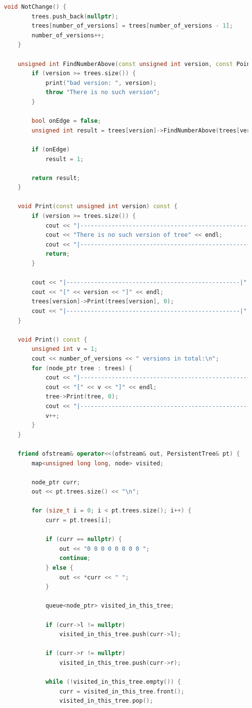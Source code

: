 \begin{lstlisting}[language=c++]
	void NotChange() {
		trees.push_back(nullptr);
		trees[number_of_versions] = trees[number_of_versions - 1];
		number_of_versions++;
	}

	unsigned int FindNumberAbove(const unsigned int version, const Point& p, long* left_ancestor, long* right_ancestor) {
		if (version >= trees.size()) {
			print("bad version: ", version);
			throw "There is no such version";
		}

		bool onEdge = false;
		unsigned int result = trees[version]->FindNumberAbove(trees[version], p, &onEdge, left_ancestor, right_ancestor);

		if (onEdge) 
			result = 1;

		return result; 
	}

	void Print(const unsigned int version) const {
		if (version >= trees.size()) {
			cout << "|--------------------------------------------------|" << endl;
			cout << "There is no such version of tree" << endl;
			cout << "|--------------------------------------------------|" << endl;
			return;
		}

		cout << "|--------------------------------------------------|" << endl;
		cout << "[" << version << "]" << endl;
		trees[version]->Print(trees[version], 0);
		cout << "|--------------------------------------------------|" << endl;
	}

	void Print() const {
		unsigned int v = 1;
		cout << number_of_versions << " versions in total:\n";
		for (node_ptr tree : trees) {
			cout << "|--------------------------------------------------|" << endl;
			cout << "[" << v << "]" << endl;
			tree->Print(tree, 0);
			cout << "|--------------------------------------------------|" << endl;
			v++;
		}
	}

	friend ofstream& operator<<(ofstream& out, PersistentTree& pt) {
		map<unsigned long long, node> visited;

		node_ptr curr;
		out << pt.trees.size() << "\n";

		for (size_t i = 0; i < pt.trees.size(); i++) {
			curr = pt.trees[i];

			if (curr == nullptr) {
				out << "0 0 0 0 0 0 0 0 ";
				continue;
			} else {
				out << *curr << " ";
			}

			queue<node_ptr> visited_in_this_tree;

			if (curr->l != nullptr)
				visited_in_this_tree.push(curr->l);

			if (curr->r != nullptr)
				visited_in_this_tree.push(curr->r);

			while (!visited_in_this_tree.empty()) {
				curr = visited_in_this_tree.front();
				visited_in_this_tree.pop();


\end{lstlisting}
